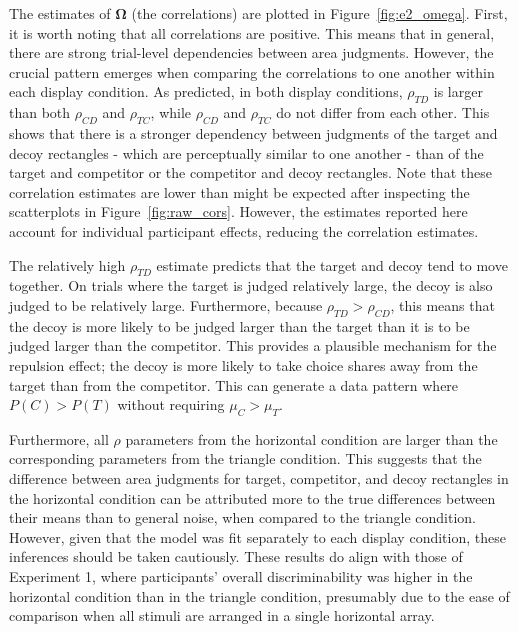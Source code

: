 The estimates of $\boldsymbol{\Omega}$ (the correlations) are plotted in Figure~\ref{fig:e2_omega}. First, it is worth noting that all correlations are positive. This means that in general, there are strong trial-level dependencies between area judgments. However, the crucial pattern emerges when comparing the correlations to one another within each display condition. As predicted, in both display conditions, $\rho_{TD}$ is larger than both $\rho_{CD}$ and $\rho_{TC}$, while $\rho_{CD}$ and $\rho_{TC}$ do not differ from each other. This shows that there is a stronger dependency between judgments of the target and decoy rectangles - which are perceptually similar to one another - than of the target and competitor or the competitor and decoy rectangles. Note that these correlation estimates are lower than might be expected after inspecting the scatterplots in Figure~\ref{fig:raw_cors}. However, the estimates reported here account for individual participant effects, reducing the correlation estimates. 

The relatively high $\rho_{TD}$ estimate predicts that the target and decoy tend to move together. On trials where the target is judged relatively large, the decoy is also judged to be relatively large. Furthermore, because $\rho_{TD}>\rho_{CD}$, this means that the decoy is more likely to be judged larger than the target than it is to be judged larger than the competitor. This provides a plausible mechanism for the repulsion effect; the decoy is more likely to take choice shares away from the target than from the competitor. This can generate a data pattern where $P(C)>P(T)$ without requiring $\mu_{C}>\mu_{T}$. 

Furthermore, all $\rho$ parameters from the horizontal condition are larger than the corresponding parameters from the triangle condition. This suggests that the difference between area judgments for target, competitor, and decoy rectangles in the horizontal condition can be attributed more to the true differences between their means than to general noise, when compared to the triangle condition. However, given that the model was fit separately to each display condition, these inferences should be taken cautiously. These results do align with those of Experiment 1, where participants' overall discriminability was higher in the horizontal condition than in the triangle condition, presumably due to the ease of comparison when all stimuli are arranged in a single horizontal array.

